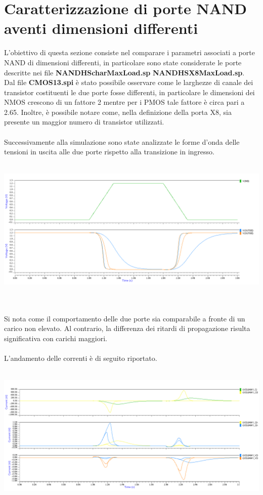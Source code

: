 \documentclass[11pt,  english, makeidx, a4paper, titlepage, oneside]{book}
\begin{document}
\section{Caratterizzazione di porte NAND aventi dimensioni differenti}
L'obiettivo di questa sezione consiste nel comparare i parametri associati a porte NAND di dimensioni differenti, in particolare sono state considerate le porte descritte nei file \textbf{NANDHScharMaxLoad.sp} \textbf{NANDHSX8MaxLoad.sp}.
\\
Dal file \textbf{CMOS13.spi} è stato possibile osservare come le larghezze di canale dei transistor costituenti le due porte fosse differenti, in particolare le dimensioni dei NMOS crescono di un fattore 2 mentre per i PMOS tale fattore è circa pari a 2.65. Inoltre, è possibile notare come, nella definizione della porta X8, sia presente un maggior numero di transistor utilizzati.
\\\\
Successivamente alla simulazione sono state analizzate le forme d'onda delle tensioni in uscita alle due porte rispetto alla transizione in ingresso.
\\\\
\centerline{\includegraphics[width=14cm]{./img/Lab_5/waveform_4.png}}
\\\\
Si nota come il comportamento delle due porte sia comparabile a fronte di un carico non elevato. Al contrario, la differenza dei ritardi di propagazione risulta significativa con carichi maggiori.
\\\\
L'andamento delle correnti è di seguito riportato.
\\\\
\centerline{\includegraphics[width=14cm]{./img/Lab_5/waveform_5.png}}
\end{document}
